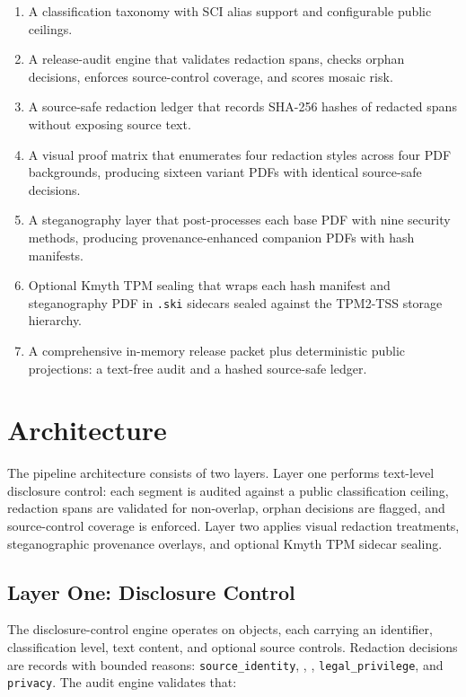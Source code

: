 \documentclass[
]{article}
\providecommand{\tightlist}{%
  \setlength{\itemsep}{0pt}\setlength{\parskip}{0pt}}
\begin{document}
\begin{enumerate}
\def\labelenumi{\arabic{enumi}.}
\tightlist
\item
  A classification taxonomy with SCI alias support and configurable
  public ceilings.
\item
  A release-audit engine that validates redaction spans, checks orphan
  decisions, enforces source-control coverage, and scores mosaic risk.
\item
  A source-safe redaction ledger that records SHA-256 hashes of redacted
  spans without exposing source text.
\item
  A visual proof matrix that enumerates four redaction styles across
  four PDF backgrounds, producing sixteen variant PDFs with identical
  source-safe decisions.
\item
  A steganography layer that post-processes each base PDF with nine
  security methods, producing provenance-enhanced companion PDFs with
  hash manifests.
\item
  Optional Kmyth TPM sealing that wraps each hash manifest and
  steganography PDF in \texttt{.ski} sidecars sealed against the
  TPM2-TSS storage hierarchy.
\item
  A comprehensive in-memory release packet plus deterministic public
  projections: a text-free audit and a hashed source-safe ledger.
\end{enumerate}

\section{Architecture}\label{architecture}

The pipeline architecture consists of two layers. Layer one performs
text-level disclosure control: each segment is audited against a public
classification ceiling, redaction spans are validated for non-overlap,
orphan decisions are flagged, and source-control coverage is enforced.
Layer two applies visual redaction treatments, steganographic provenance
overlays, and optional Kmyth TPM sidecar sealing.

\subsection{Layer One: Disclosure
Control}\label{layer-one-disclosure-control}

The disclosure-control engine operates on 
objects, each carrying an identifier, classification level, text
content, and optional source controls. Redaction decisions are
 records with bounded reasons:
\texttt{source\_identity}, ,
, \texttt{legal\_privilege}, and
\texttt{privacy}. The audit engine validates that:
\end{document}
